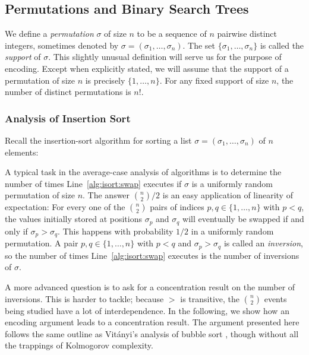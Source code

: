 \documentclass[prodmode,acmcsur]{acmsmall}
\begin{document}
\subsection{Permutations and Binary Search Trees}

We define a \emph{permutation} $\sigma$ of size $n$ to be a sequence
of $n$ pairwise distinct integers, sometimes denoted by
$\sigma = (\sigma_1, \dots, \sigma_n)$. The set
$\{\sigma_1, \dots, \sigma_n\}$ is called the
\emph{support} of $\sigma$. This slightly unusual
definition will serve us for the purpose of encoding. Except when
explicitly stated, we will assume that the support of a permutation
of size $n$
is precisely $\{1, \dots, n\}$. For any fixed support of
size $n$, the number of distinct permutations 
is $n!$.

\subsubsection{Analysis of Insertion Sort}

Recall the insertion-sort algorithm for sorting a list
$\sigma = (\sigma_1,\ldots,\sigma_n)$ of $n$ elements:

\begin{algorithmic}[1]
         \label{alg:isort:swap}
     \ENDWHILE
  \ENDFOR
\end{algorithmic}

A typical task in the average-case analysis of algorithms is to
determine the number of times Line~\ref{alg:isort:swap} executes 
if $\sigma$ is a
uniformly random permutation of size $n$.  The answer
$\binom{n}{2}/2$ is an easy application of linearity of expectation:
For every one of the $\binom{n}{2}$ pairs of indices 
$p,q\in\{1,\dots,n\}$ with
$p<q$, the values initially stored at positions $\sigma_p$ and
$\sigma_q$ will eventually be swapped if and only if
$\sigma_p > \sigma_q$. This happens with probability $1/2$ in a
uniformly random permutation. A pair $p, q \in \{1, \dots, n\}$ with
$p < q$ and $\sigma_p > \sigma_q$ is called an
\emph{inversion}, so the number of times Line~\ref{alg:isort:swap} 
executes is the number
of inversions of $\sigma$.

A more advanced question is to ask for a concentration result on the
number of inversions. This is harder to tackle; because $>$
is transitive, the $\binom{n}{2}$ events being studied have a lot of
interdependence. In the following, we show how an encoding argument
leads to a concentration result.  The argument
presented here follows the same outline as Vit\'{a}nyi's analysis of
bubble sort \cite{vitanyi:analysis}, though without all the trappings
of Kolmogorov complexity.
\end{document}
